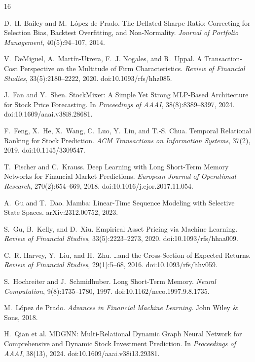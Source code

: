 \documentclass[11pt,twocolumn]{article}
\begin{document}
\begin{thebibliography}{16}\footnotesize

 D.~H. Bailey and M.~L\'opez de Prado. The Deflated
Sharpe Ratio: Correcting for Selection Bias, Backtest Overfitting, and
Non-Normality. \textit{Journal of Portfolio Management}, 40(5):94--107,
2014.

 V.~DeMiguel, A.~Mart\'in-Utrera, F.~J. Nogales, and
R.~Uppal. A Transaction-Cost Perspective on the Multitude of Firm
Characteristics. \textit{Review of Financial Studies}, 33(5):2180--2222,
2020. doi:10.1093/rfs/hhz085.

 J.~Fan and Y.~Shen. StockMixer: A Simple Yet Strong
MLP-Based Architecture for Stock Price Forecasting. In \textit{Proceedings
of AAAI}, 38(8):8389--8397, 2024. doi:10.1609/aaai.v38i8.28681.

 F.~Feng, X.~He, X.~Wang, C.~Luo, Y.~Liu, and T.-S.
Chua. Temporal Relational Ranking for Stock Prediction. \textit{ACM
Transactions on Information Systems}, 37(2), 2019.
doi:10.1145/3309547.

 T.~Fischer and C.~Krauss. Deep Learning with Long
Short-Term Memory Networks for Financial Market Predictions.
\textit{European Journal of Operational Research}, 270(2):654--669, 2018.
doi:10.1016/j.ejor.2017.11.054.

 A.~Gu and T.~Dao. Mamba: Linear-Time Sequence Modeling
with Selective State Spaces. arXiv:2312.00752, 2023.

 S.~Gu, B.~Kelly, and D.~Xiu. Empirical Asset Pricing via
Machine Learning. \textit{Review of Financial Studies},
33(5):2223--2273, 2020. doi:10.1093/rfs/hhaa009.

 C.~R. Harvey, Y.~Liu, and H.~Zhu. \ldots and the
Cross-Section of Expected Returns. \textit{Review of Financial Studies},
29(1):5--68, 2016. doi:10.1093/rfs/hhv059.

 S.~Hochreiter and J.~Schmidhuber. Long Short-Term
Memory. \textit{Neural Computation}, 9(8):1735--1780, 1997.
doi:10.1162/neco.1997.9.8.1735.

 M.~L\'opez de Prado. \textit{Advances in Financial
Machine Learning}. John Wiley \& Sons, 2018.

 H.~Qian et al. MDGNN: Multi-Relational Dynamic Graph
Neural Network for Comprehensive and Dynamic Stock Investment Prediction.
In \textit{Proceedings of AAAI}, 38(13), 2024.
doi:10.1609/aaai.v38i13.29381.


\end{thebibliography}
\end{document}
